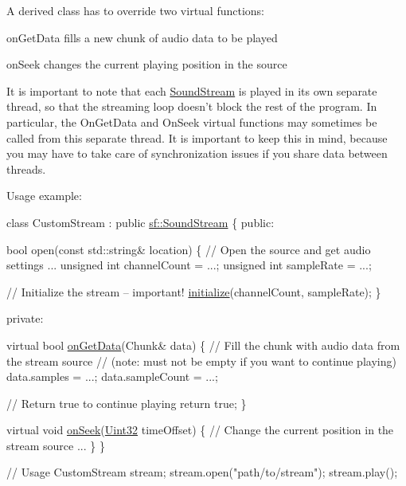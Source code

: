 A derived class has to override two virtual functions\-: \begin{DoxyItemize}
\item on\-Get\-Data fills a new chunk of audio data to be played \item on\-Seek changes the current playing position in the source\end{DoxyItemize}
It is important to note that each \hyperlink{classsf_1_1_sound_stream}{Sound\-Stream} is played in its own separate thread, so that the streaming loop doesn't block the rest of the program. In particular, the On\-Get\-Data and On\-Seek virtual functions may sometimes be called from this separate thread. It is important to keep this in mind, because you may have to take care of synchronization issues if you share data between threads.

Usage example\-: 
\begin{DoxyCode}
\textcolor{keyword}{class }CustomStream : \textcolor{keyword}{public} \hyperlink{classsf_1_1_sound_stream}{sf::SoundStream}
\{
\textcolor{keyword}{public}:

    \textcolor{keywordtype}{bool} open(\textcolor{keyword}{const} std::string& location)
    \{
        \textcolor{comment}{// Open the source and get audio settings}
        ...
        \textcolor{keywordtype}{unsigned} \textcolor{keywordtype}{int} channelCount = ...;
        \textcolor{keywordtype}{unsigned} \textcolor{keywordtype}{int} sampleRate = ...;

        \textcolor{comment}{// Initialize the stream -- important!}
        \hyperlink{classsf_1_1_sound_stream_a9c351711198ee1aa77c2fefd3ced4d2c}{initialize}(channelCount, sampleRate);
    \}

\textcolor{keyword}{private}:

    \textcolor{keyword}{virtual} \textcolor{keywordtype}{bool} \hyperlink{classsf_1_1_sound_stream_a968ec024a6e45490962c8a1121cb7c5f}{onGetData}(Chunk& data)
    \{
        \textcolor{comment}{// Fill the chunk with audio data from the stream source}
        \textcolor{comment}{// (note: must not be empty if you want to continue playing)}
        data.samples = ...;
        data.sampleCount = ...;

        \textcolor{comment}{// Return true to continue playing}
        \textcolor{keywordflow}{return} \textcolor{keyword}{true};
    \}

    \textcolor{keyword}{virtual} \textcolor{keywordtype}{void} \hyperlink{classsf_1_1_sound_stream_a907036dd2ca7d3af5ead316e54b75997}{onSeek}(\hyperlink{namespacesf_aa746fb1ddef4410bddf198ebb27e727c}{Uint32} timeOffset)
    \{
        \textcolor{comment}{// Change the current position in the stream source}
        ...
    \}
\}

\textcolor{comment}{// Usage}
CustomStream stream;
stream.open(\textcolor{stringliteral}{"path/to/stream"});
stream.play();
\end{DoxyCode}


